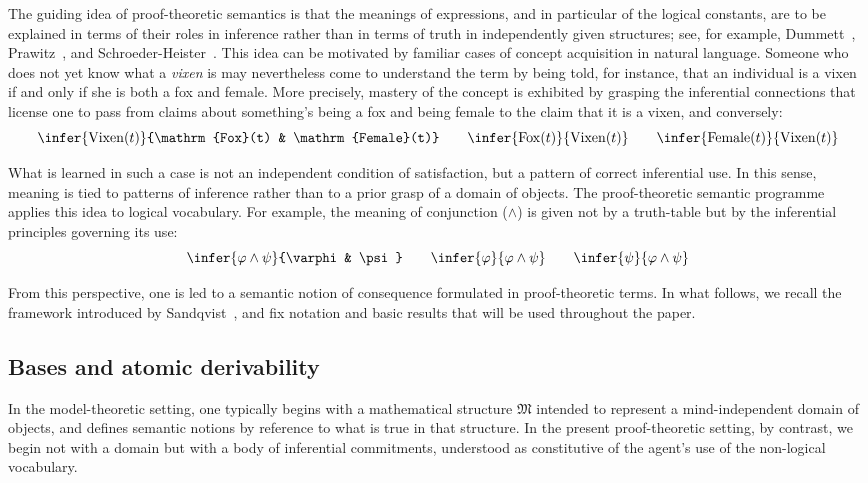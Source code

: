 \documentclass[reqno]{asl}
\begin{document}
The guiding idea of proof-theoretic semantics is that the meanings of expressions, and in particular of the logical constants, are to be explained in terms of their roles in inference rather than in terms of truth in independently given structures; see, for example, Dummett~\cite{dummett1993theoryI,dummett1991logicalbasis}, Prawitz~\cite{prawitz2006natural,prawitz1973towards}, and Schroeder-Heister~\cite{Schroeder-Heister_2008,Schroeder-Heister_2024}. This idea can be motivated by familiar cases of concept acquisition in natural language. Someone who does not yet know what a \emph{vixen} is may nevertheless come to understand the term by being told, for instance, that an individual is a vixen if and only if she is both a fox and female. More precisely, mastery of the concept is exhibited by grasping the inferential connections that license one to pass from claims about something's being a fox and being female to the claim that it is a vixen, and conversely:
\[
\infer{\mathrm{Vixen}(t)}{\mathrm{Fox}(t) & \mathrm{Female}(t)}
\qquad
\infer{\mathrm{Fox}(t)}{\mathrm{Vixen}(t)}
\qquad
\infer{\mathrm{Female}(t)}{\mathrm{Vixen}(t)}
\]

What is learned in such a case is not an independent condition of satisfaction, but a pattern of correct inferential use. In this sense, meaning is tied to patterns of inference rather than to a prior grasp of a domain of objects.
The proof-theoretic semantic programme applies this idea to logical vocabulary. For example, the meaning of conjunction ($\land$) is given not by a truth-table but by the inferential principles governing its use:
\[
\infer{\varphi \land \psi}{\varphi & \psi}
\qquad
\infer{\varphi}{\varphi \land \psi}
\qquad
\infer{\psi}{\varphi \land \psi}
\]

From this perspective, one is led  to a semantic notion of consequence formulated in proof-theoretic terms. In what follows, we recall the framework introduced by Sandqvist~\cite{Sandqvist2005inferentialist,Sandqvist_2009}, and fix notation and basic results that will be used throughout the paper.

\subsection{Bases and atomic derivability}

In the model-theoretic setting, one typically begins with a mathematical structure $\mathfrak{M}$ intended to represent a mind-independent domain of objects, and defines semantic notions by reference to what is true in that structure. In the present proof-theoretic setting, by contrast, we begin not with a domain but with a body of inferential commitments, understood as constitutive of the agent's use of the non-logical vocabulary. 
\end{document}
